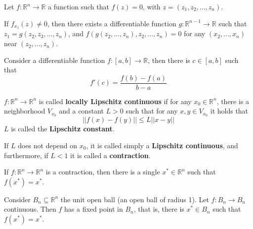 \documentclass[aspectratio=169]{beamer}
\begin{document}
\begin{frame}
    
    \begin{theorem}
        Let $f:\mathbb{R}^n\rightarrow\mathbb{R}$ a function such that $f(z)=0$, with $z=(z_1,z_2,...,z_n)$. 
        
        If $f_{x_1}(z)\neq 0$, then there exists a differentiable function $g:\mathbb{R}^{n-1}\rightarrow\mathbb{R}$ such that $z_1=g(z_2,z_3,...,z_n)$, and $f(g(z_2,...,z_n),z_2,...,z_n)=0$ for any $(x_2,...,x_n)$ near $(z_2,...,z_n)$.
    \end{theorem}
    
\end{frame}

\begin{frame}
    
    \begin{theorem}
        Consider a differentiable function $f:[a,b]\rightarrow\mathbb{R}$, then there is $c\in[a,b]$ such that $$f'(c)=\frac{f(b)-f(a)}{b-a}$$
    \end{theorem}
    
\end{frame}

\begin{frame}
    \begin{definition}
        $f:\mathbb{R}^n\rightarrow\mathbb{R}^n$ is called \textbf{locally Lipschitz continuous} if for any $x_0\in\mathbb{R}^n$, there is a neighborhood $V_{x_0}$ and a constant $L>0$ such that for any $x,y\in V_{x_0}$ it holds that $$||f(x)-f(y)||\leq L ||x-y||$$ $L$ is called the \textbf{Lipschitz constant}.
        
        If $L$ does not depend on $x_0$, it is called simply a \textbf{Lipschitz continuous}, and furthermore, if $L<1$ it is called a \textbf{contraction}.
    \end{definition}
\end{frame}

\begin{frame}
\begin{theorem}
    If $f:\mathbb{R}^n\rightarrow\mathbb{R}^n$ is a contraction, then there is a single $x^*\in\mathbb{R}^n$ such that $f(x^*)=x^*$.
\end{theorem}
\end{frame}

\begin{frame}
    \begin{theorem}
        Consider $B_n\subseteq\mathbb{R}^n$ the unit open ball (an open ball of radius 1). Let $f:B_n\rightarrow B_n$ continuous. Then $f$ has a fixed point in $B_n$, that is, there is $x^*\in B_n$ such that $f(x^*)=x^*$.
    \end{theorem}
    
\end{frame}
\end{document}
